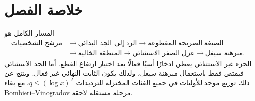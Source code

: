 \section{خلاصة الفصل}

المسار الكامل هو
\[
\begin{aligned}
\text{مرشح الشخصيات}
&\longrightarrow
\text{الرد إلى الجد البدائي}
\longrightarrow
\text{الصيغة الصريحة المقطوعة}
\\
&\longrightarrow
\text{المنطقة الخالية}
\longrightarrow
\text{عزل الصفر الاستثنائي}
\longrightarrow
\text{مبرهنة سيغل}.
\end{aligned}
\]
الجزء غير الاستثنائي يعطي ادخارًا أسيًا فعالًا بعد اختيار ارتفاع القطع.
أما الحد الاستثنائي فيمتص فقط باستعمال مبرهنة سيغل، ولذلك يكون الثابت
النهائي غير فعال. وينتج عن ذلك توزيع موحد للأوليات في جميع الفئات المختزلة
للترديدات \(q\le(\log x)^A\)، مع بقاء Bombieri--Vinogradov مرحلة مستقلة
لاحقة.
